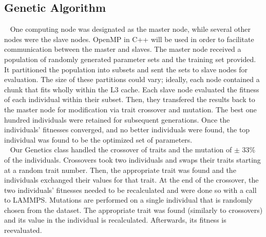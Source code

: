\documentclass[letterpaper, 12pt]{article}
\begin{document}
\begin{flushleft}
\subsection*{Genetic Algorithm}

~\newline
One computing node was designated as the master node, while several other nodes were the slave nodes.  OpenMP in C++ will be used in order to facilitate communication between the master and slaves. The master node received a population of randomly generated parameter sets and the training set provided.  It partitioned the population into subsets and sent the sets to slave nodes for evaluation.  The size of these partitions could vary; ideally, each node contained a chunk that fits wholly within the L3 cache. Each slave node evaluated the fitness of each individual within their subset. Then, they transfered the results back to the  master node for modification via trait crossover and mutation. The best one hundred individuals were retained for subsequent generations.  Once the individuals' fitnesses converged, and no better individuals were found, the top individual was found to be the optimized set of parameters.\\

~\newline
Our Genetics class handled the crossover of traits and the mutation of $\pm$ 33\% of the individuals.  Crossovers took two individuals and swaps their traits starting at a random trait number.  Then, the appropriate trait was found and the individuals exchanged their values for that trait.  At the end of the crossover, the two individuals' fitnesses needed to be recalculated and were done so with a call to LAMMPS.  Mutations are performed on a single individual that is randomly chosen from the dataset.  The appropriate trait was found (similarly to crossovers) and its value in the individual is recalculated.  Afterwards, its fitness is reevaluated. \\


\end{flushleft}
\end{document}
